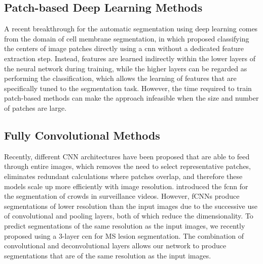 \subsection[Patch-based deep learning methods]{Patch-based Deep Learning
Methods}

A recent breakthrough for the automatic segmentation using deep learning comes
from the domain of cell membrane segmentation, in which \citet{ciresan2012}
proposed classifying the centers of image patches directly using a \gls{cnn}
\citep{lecun1998} without a dedicated feature extraction step. Instead, features
are learned indirectly within the lower layers of the neural network during
training, while the higher layers can be regarded as performing the
classification, which allows the learning of features that are specifically
tuned to the segmentation task. However, the time required to train patch-based
methods can make the approach infeasible when the size and number of patches are
large.

\subsection[Fully convolutional methods]{Fully Convolutional Methods}

Recently, different CNN architectures
\citep{long2015,ronneberger2015,brosch2015,kang2014} have been proposed
that are able to feed through entire images, which removes the need to select
representative patches, eliminates redundant calculations where patches overlap,
and therefore these models scale up more efficiently with image resolution.
\citet{kang2014} introduced the \gls{fcnn} for the segmentation of crowds
in surveillance videos. However, fCNNs produce segmentations of lower resolution
than the input images due to the successive use of convolutional and pooling
layers, both of which reduce the dimensionality. To predict segmentations of the
same resolution as the input images, we recently proposed using a 3-layer
\gls{cen} \citep{brosch2015} for MS lesion segmentation. The combination of
convolutional \citep{lecun1998} and deconvolutional \citep{zeiler2011} layers
allows our network to produce segmentations that are of the same resolution as
the input images.

